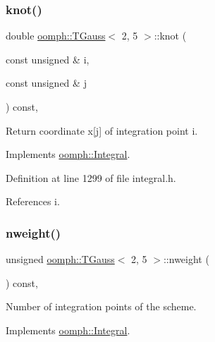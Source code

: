 \subsubsection{\texorpdfstring{knot()}{knot()}}
{\footnotesize\ttfamily double \hyperlink{classoomph_1_1TGauss}{oomph\+::\+T\+Gauss}$<$ 2, 5 $>$\+::knot (\begin{DoxyParamCaption}\item[{const unsigned \&}]{i,  }\item[{const unsigned \&}]{j }\end{DoxyParamCaption}) const\hspace{0.3cm}{\ttfamily [inline]}, {\ttfamily [virtual]}}



Return coordinate x\mbox{[}j\mbox{]} of integration point i. 



Implements \hyperlink{classoomph_1_1Integral_a1a2122f99a87c18649bafdd9ed739758}{oomph\+::\+Integral}.



Definition at line 1299 of file integral.\+h.



References i.

\mbox{\label{classoomph_1_1TGauss_3_012_00_015_01_4_a0e8e1904d7ac8d041fcffb888fdc1611}} 
\subsubsection{\texorpdfstring{nweight()}{nweight()}}
{\footnotesize\ttfamily unsigned \hyperlink{classoomph_1_1TGauss}{oomph\+::\+T\+Gauss}$<$ 2, 5 $>$\+::nweight (\begin{DoxyParamCaption}{ }\end{DoxyParamCaption}) const\hspace{0.3cm}{\ttfamily [inline]}, {\ttfamily [virtual]}}



Number of integration points of the scheme. 



Implements \hyperlink{classoomph_1_1Integral_a1a270de9d99a1fcf1d25a6c1017f65fa}{oomph\+::\+Integral}.



